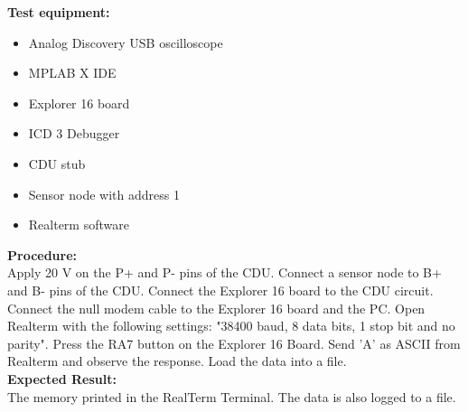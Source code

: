 \textbf{Test equipment:}
\begin{itemize}
\item Analog Discovery USB oscilloscope
\item MPLAB X IDE
\item Explorer 16 board
\item ICD 3 Debugger
\item CDU stub
\item Sensor node with address 1
\item Realterm software
\end{itemize}

\textbf{Procedure:}\\
Apply 20 V on the P+ and P- pins of the CDU. Connect a sensor node to B+ and B- pins of the CDU. Connect the Explorer 16 board to the CDU circuit. Connect the null modem cable to the Explorer 16 board and the PC. Open Realterm with the following settings: "38400 baud, 8 data bits, 1 stop bit and no parity". Press the RA7 button on the Explorer 16 Board. Send 'A' as ASCII from Realterm and observe the response. Load the data into a file.\\

\textbf{Expected Result:}\\
The memory printed in the RealTerm Terminal. The data is also logged to a file.\\

